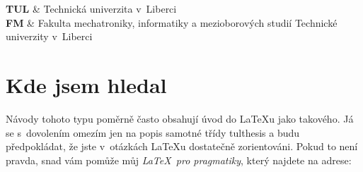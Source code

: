 \documentclass[FM,SP,localfonts]{tulthesis}
\newcommand{\argument}[1]{{\ttfamily\color{\tulcolor}#1}}
\begin{document}

\tableofcontents

\clearpage

\begin{abbrList}
\textbf{TUL} & Technická univerzita v~Liberci \\
\textbf{FM} & Fakulta mechatroniky, informatiky a mezioborových studií
Technické univerzity v~Liberci \\
\end{abbrList}

\chapter{Kde jsem hledal}

Návody tohoto typu poměrně často obsahují úvod do \LaTeX u jako takového. Já se
s~dovolením omezím jen na popis samotné třídy \argument{tulthesis} a budu
předpokládat, že jste v~otázkách \LaTeX u dostatečně zorientováni. Pokud
to není pravda, snad vám pomůže můj \emph{\LaTeX\ pro pragmatiky}, který
najdete na adrese:

\printbibliography[title={Reference}]
\end{document}
